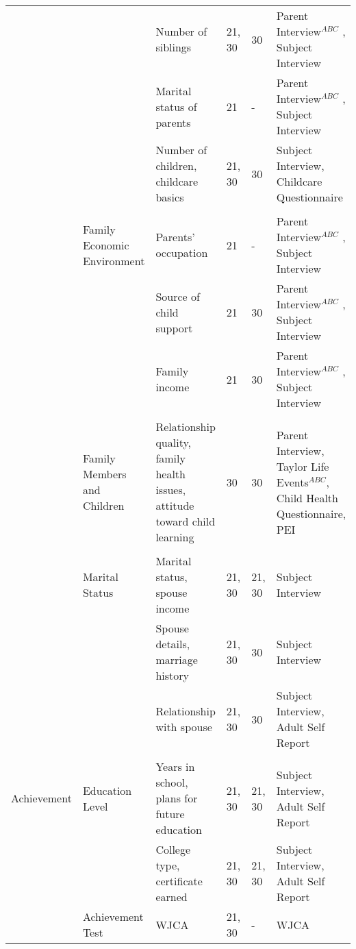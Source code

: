 \begin{sidewaystable}[H]
\begin{threeparttable}
\begin{tabular}{L{3.5cm} C{3.5cm} C{5cm} C{1.5cm} C{1.5cm} C{6cm}}
        	&	               	&	       Number of siblings      	&	       21, 30  	&	30	&	       Parent Interview$^{ABC}$ , Subject Interview    \\
        	&	               	&	       Marital status of parents       	&	21	&	-	&	       Parent Interview$^{ABC}$ , Subject Interview    \\
        	&	               	&	       Number of children, childcare basics    	&	       21, 30  	&	30	&	       Subject Interview, Childcare Questionnaire      \\
\\										
        	&	       Family Economic Environment     	&	       Parents' occupation     	&	21	&	-	&	       Parent Interview$^{ABC}$ , Subject Interview    \\
        	&	               	&	       Source of child support 	&	21	&	30	&	       Parent Interview$^{ABC}$ , Subject Interview    \\
        	&	               	&	       Family income   	&	21	&	30	&	       Parent Interview$^{ABC}$ , Subject Interview    \\
\\										
        	&	       Family Members and Children	&	Relationship quality, family health issues, attitude toward child learning	&	30	&	30	&	       Parent Interview, Taylor Life Events$^{ABC}$, Child Health Questionnaire, PEI    \\
\\										
        	&	       Marital Status  	&	       Marital status, spouse income       	&	       21, 30  	&	21, 30	&	       Subject Interview       \\
        	&	               	&	       Spouse details, marriage history	&	       21, 30  	&	30	&	       Subject Interview       \\
        	&	               	&	       Relationship with spouse        	&	       21, 30  	&	30	&	       Subject Interview, Adult Self Report    \\
\\										
 Achievement   	&	       Education Level 	&	       Years in school, plans for future education      	&	       21, 30  	&	       21, 30  	&	       Subject Interview, Adult Self Report    \\
        	&	               	&	       College type, certificate earned        	&	       21, 30  	&	       21, 30  	&	       Subject Interview, Adult Self Report    \\
	&	Achievement Test	&	       WJCA    	&	       21, 30  	&	-	&	       WJCA    \\

\end{tabular}
\end{threeparttable}
\end{sidewaystable}
